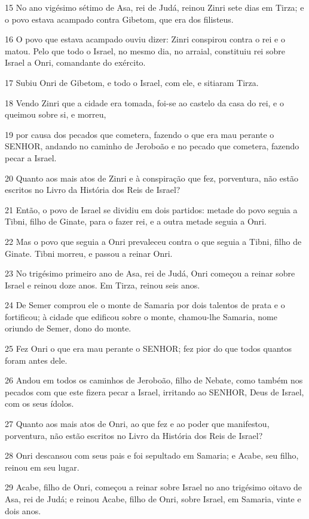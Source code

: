 \par 15 No ano vigésimo sétimo de Asa, rei de Judá, reinou Zinri sete dias em Tirza; e o povo estava acampado contra Gibetom, que era dos filisteus.
\par 16 O povo que estava acampado ouviu dizer: Zinri conspirou contra o rei e o matou. Pelo que todo o Israel, no mesmo dia, no arraial, constituiu rei sobre Israel a Onri, comandante do exército.
\par 17 Subiu Onri de Gibetom, e todo o Israel, com ele, e sitiaram Tirza.
\par 18 Vendo Zinri que a cidade era tomada, foi-se ao castelo da casa do rei, e o queimou sobre si, e morreu,
\par 19 por causa dos pecados que cometera, fazendo o que era mau perante o SENHOR, andando no caminho de Jeroboão e no pecado que cometera, fazendo pecar a Israel.
\par 20 Quanto aos mais atos de Zinri e à conspiração que fez, porventura, não estão escritos no Livro da História dos Reis de Israel?
\par 21 Então, o povo de Israel se dividiu em dois partidos: metade do povo seguia a Tibni, filho de Ginate, para o fazer rei, e a outra metade seguia a Onri.
\par 22 Mas o povo que seguia a Onri prevaleceu contra o que seguia a Tibni, filho de Ginate. Tibni morreu, e passou a reinar Onri.
\par 23 No trigésimo primeiro ano de Asa, rei de Judá, Onri começou a reinar sobre Israel e reinou doze anos. Em Tirza, reinou seis anos.
\par 24 De Semer comprou ele o monte de Samaria por dois talentos de prata e o fortificou; à cidade que edificou sobre o monte, chamou-lhe Samaria, nome oriundo de Semer, dono do monte.
\par 25 Fez Onri o que era mau perante o SENHOR; fez pior do que todos quantos foram antes dele.
\par 26 Andou em todos os caminhos de Jeroboão, filho de Nebate, como também nos pecados com que este fizera pecar a Israel, irritando ao SENHOR, Deus de Israel, com os seus ídolos.
\par 27 Quanto aos mais atos de Onri, ao que fez e ao poder que manifestou, porventura, não estão escritos no Livro da História dos Reis de Israel?
\par 28 Onri descansou com seus pais e foi sepultado em Samaria; e Acabe, seu filho, reinou em seu lugar.
\par 29 Acabe, filho de Onri, começou a reinar sobre Israel no ano trigésimo oitavo de Asa, rei de Judá; e reinou Acabe, filho de Onri, sobre Israel, em Samaria, vinte e dois anos.
